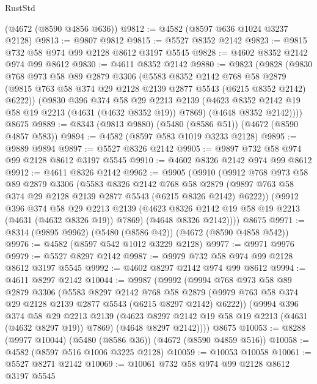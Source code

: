 \begin{lexlean}{RustStd}
\begin{coremodule}
{\begin{coremodule}
{{{{{{{{{{{{{{{{    (@4672 (@8590 @4856 @636))
@9812 := @4582 (@8597 @636 @1024 @3237 @2128)
@9813 := @9807 @9812
@9815 := @5527 @8352 @2142
@9823 := @9815 @732 @58 @974 @99 @2128 @8612 @3197 @5545
@9828 := @4602 @8352 @2142 @974 @99 @8612
@9830 := @4611 @8352 @2142
@9880 := @9823
    (@9828
      (@9830
        @768
        @973
        @58
        @89
        @2879
        @3306
        (@5583
          @8352
          @2142
          @768
          @58
          @2879
          (@9815 @763 @58 @374 @29 @2128 @2139 @2877 @5543 (@6215 @8352 @2142) @6222))
        (@9830
          @396
          @374
          @58
          @29
          @2213
          @2139
          (@4623 @8352 @2142 @19 @58 @19 @2213 (@4631 (@4632 @8352 @19)) @7869)
          (@4648 @8352 @2142))))
    @8675
@9889 := @8343 (@9813 @9880) (@5480 (@8586 @51)) (@4672 (@8590 @4857 @583))
@9894 := @4582 (@8597 @583 @1019 @3233 @2128)
@9895 := @9889 @9894
@9897 := @5527 @8326 @2142
@9905 := @9897 @732 @58 @974 @99 @2128 @8612 @3197 @5545
@9910 := @4602 @8326 @2142 @974 @99 @8612
@9912 := @4611 @8326 @2142
@9962 := @9905
    (@9910
      (@9912
        @768
        @973
        @58
        @89
        @2879
        @3306
        (@5583
          @8326
          @2142
          @768
          @58
          @2879
          (@9897 @763 @58 @374 @29 @2128 @2139 @2877 @5543 (@6215 @8326 @2142) @6222))
        (@9912
          @396
          @374
          @58
          @29
          @2213
          @2139
          (@4623 @8326 @2142 @19 @58 @19 @2213 (@4631 (@4632 @8326 @19)) @7869)
          (@4648 @8326 @2142))))
    @8675
@9971 := @8314 (@9895 @9962) (@5480 (@8586 @42)) (@4672 (@8590 @4858 @542))
@9976 := @4582 (@8597 @542 @1012 @3229 @2128)
@9977 := @9971 @9976
@9979 := @5527 @8297 @2142
@9987 := @9979 @732 @58 @974 @99 @2128 @8612 @3197 @5545
@9992 := @4602 @8297 @2142 @974 @99 @8612
@9994 := @4611 @8297 @2142
@10044 := @9987
    (@9992
      (@9994
        @768
        @973
        @58
        @89
        @2879
        @3306
        (@5583
          @8297
          @2142
          @768
          @58
          @2879
          (@9979 @763 @58 @374 @29 @2128 @2139 @2877 @5543 (@6215 @8297 @2142) @6222))
        (@9994
          @396
          @374
          @58
          @29
          @2213
          @2139
          (@4623 @8297 @2142 @19 @58 @19 @2213 (@4631 (@4632 @8297 @19)) @7869)
          (@4648 @8297 @2142))))
    @8675
@10053 := @8288 (@9977 @10044) (@5480 (@8586 @36)) (@4672 (@8590 @4859 @516))
@10058 := @4582 (@8597 @516 @1006 @3225 @2128)
@10059 := @10053 @10058
@10061 := @5527 @8271 @2142
@10069 := @10061 @732 @58 @974 @99 @2128 @8612 @3197 @5545
}}}}}}}}}}}}}}}}
\end{coremodule}}
\end{coremodule}
\end{lexlean}
